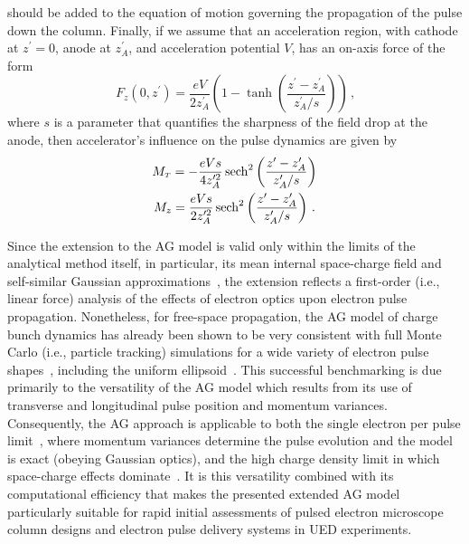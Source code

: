 should be added to the equation of motion governing the propagation of the pulse down the column.
Finally, if we assume that an acceleration region, with cathode at $z^{\prime} = 0$, anode at $z^{\prime}_A$, and acceleration potential $V$, has an on-axis force of the form
\begin{equation}
  F_z(0,z^{\prime}) = \frac{eV}{2z^{\prime}_A} \left( 1 - \tanh \left( \frac{ z^{\prime} - z^{\prime}_A }{ z^{\prime}_A / s } \right) \right) \,\text{,}
\end{equation}
where $s$ is a parameter that quantifies the sharpness of the field drop at the anode, then accelerator's influence on the pulse dynamics are given by
\begin{gather}
  M_{{\scriptscriptstyle T}} = -\frac{eVs}{4z^{\prime 2}_A} \operatorname{sech}^2 \left( \frac{z^{\prime} - z^{\prime}_A }{ z^{\prime}_A / s } \right) \\
  M_z = \frac{eVs}{2z^{\prime 2}_A} \operatorname{sech}^2 \left( \frac{z^{\prime} - z^{\prime}_A }{ z^{\prime}_A / s } \right) \, \text{.}
\end{gather}

Since the extension to the AG model is valid only within the limits of the analytical method itself, in particular, its mean internal space-charge field and self-similar Gaussian approximations~\cite{michalik_analytic_2006}, the extension reflects a first-order (i.e., linear force) analysis of the effects of electron optics upon electron pulse propagation.
Nonetheless, for free-space propagation, the AG model of charge bunch dynamics has already been shown to be very consistent with full Monte Carlo (i.e., particle tracking) simulations for a wide variety of electron pulse shapes~\cite{michalik_analytic_2006,michalik_evolution_2009}, including the uniform ellipsoid~\cite{luiten_how_2004}.
This successful benchmarking is due primarily to the versatility of the AG model which results from its use of transverse and longitudinal pulse position and momentum variances.
Consequently, the AG approach is applicable to both the single electron per pulse limit~\cite{lobastov_four-dimensional_2005}, where momentum variances determine the pulse evolution and the model is exact (obeying Gaussian optics), and the high charge density limit in which space-charge effects dominate~\cite{luiten_how_2004,siwick_ultrafast_2002,cao_femtosecond_2003}.
It is this versatility combined with its computational efficiency that makes the presented extended AG model particularly suitable for rapid initial assessments of pulsed electron microscope column designs and electron pulse delivery systems in UED experiments.

